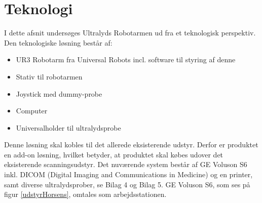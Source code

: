 \chapter{Teknologi} \label{Teknologi}
I dette afsnit undersøges Ultralyds Robotarmen ud fra et teknologisk perspektiv.  \\
Den teknologiske løsning består af:
\begin{itemize}
\item UR3 Robotarm fra Universal Robots incl. software til styring af denne
\item Stativ til robotarmen
\item Joystick med dummy-probe
\item Computer
\item Universalholder til ultralydsprobe
\end{itemize}
Denne løsning skal kobles til det allerede eksisterende udstyr. Derfor er produktet en add-on løsning, hvilket betyder, at produktet skal købes udover det eksisterende scanningsudstyr. Det nuværende system består af GE Voluson S6 inkl. DICOM (Digital Imaging and Communications in Medicine) og en printer, samt diverse ultralydsprober, se Bilag 4 og Bilag 5. GE Voluson S6, som ses på figur \ref{udstyrHorsens}, omtales som arbejdsstationen. 

